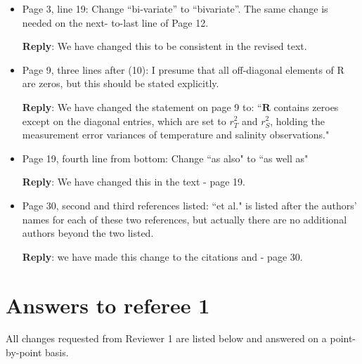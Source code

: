 \documentclass[a4paper]{article}
\newcommand{\bR}{ {\boldsymbol R} }
\def\reply{\textbf{Reply}}
\begin{document}


\vspace{5mm}
\begin{itemize}[noitemsep,topsep=0pt,parsep=0pt,partopsep=0pt]

\item Page 3, line 19: Change “bi-variate” to “bivariate”. The same change is needed on the next-
to-last line of Page 12.

\reply: We have changed this to be consistent in the revised text.

\item Page 9, three lines after (10): I presume that all off-diagonal elements of R are zeros, but this
should be stated explicitly.

\reply: We have changed the statement on page 9 to: ``$\bR$ contains zeroes except on the diagonal entries, which are set to $r^2_T$ and $r^2_S$, holding the measurement error variances of temperature and salinity observations."

\item Page 19, fourth line from bottom: Change ``as also" to ``as well as"

\reply: We have changed this in the text - page 19.

\item Page 30, second and third references listed: ``et al." is listed after the authors’ names for each
of these two references, but actually there are no additional authors beyond the two listed.

\reply: we have made this change to the citations \cite{genton2015cross} and \cite{french2016credible} - page 30.
\end{itemize}


\section*{Answers to referee 1}
All changes requested from Reviewer 1 are listed below and answered on a point-by-point basis.
\end{document}
